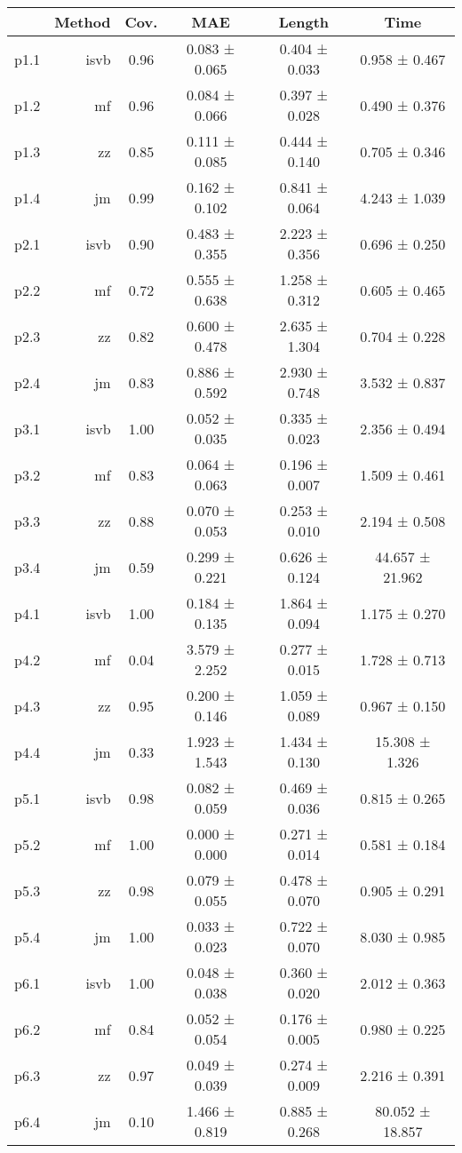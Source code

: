 
\begin{tabular}{lrcccc}
\toprule
  & Method & Cov.  & MAE & Length & Time\\
\midrule
p1.1 & isvb & 0.96 & 0.083 ± 0.065 & 0.404 ± 0.033 & 0.958 ± 0.467\\
p1.2 & mf & 0.96 & 0.084 ± 0.066 & 0.397 ± 0.028 & 0.490 ± 0.376\\
p1.3 & zz & 0.85 & 0.111 ± 0.085 & 0.444 ± 0.140 & 0.705 ± 0.346\\
p1.4 & jm & 0.99 & 0.162 ± 0.102 & 0.841 ± 0.064 & 4.243 ± 1.039\\
\hline
p2.1 & isvb & 0.90 & 0.483 ± 0.355 & 2.223 ± 0.356 & 0.696 ± 0.250\\
p2.2 & mf & 0.72 & 0.555 ± 0.638 & 1.258 ± 0.312 & 0.605 ± 0.465\\
p2.3 & zz & 0.82 & 0.600 ± 0.478 & 2.635 ± 1.304 & 0.704 ± 0.228\\
p2.4 & jm & 0.83 & 0.886 ± 0.592 & 2.930 ± 0.748 & 3.532 ± 0.837\\
\hline
p3.1 & isvb & 1.00 & 0.052 ± 0.035 & 0.335 ± 0.023 & 2.356 ± 0.494\\
p3.2 & mf & 0.83 & 0.064 ± 0.063 & 0.196 ± 0.007 & 1.509 ± 0.461\\
p3.3 & zz & 0.88 & 0.070 ± 0.053 & 0.253 ± 0.010 & 2.194 ± 0.508\\
p3.4 & jm & 0.59 & 0.299 ± 0.221 & 0.626 ± 0.124 & 44.657 ± 21.962\\
\hline
p4.1 & isvb & 1.00 & 0.184 ± 0.135 & 1.864 ± 0.094 & 1.175 ± 0.270\\
p4.2 & mf & 0.04 & 3.579 ± 2.252 & 0.277 ± 0.015 & 1.728 ± 0.713\\
p4.3 & zz & 0.95 & 0.200 ± 0.146 & 1.059 ± 0.089 & 0.967 ± 0.150\\
p4.4 & jm & 0.33 & 1.923 ± 1.543 & 1.434 ± 0.130 & 15.308 ± 1.326\\
\hline
p5.1 & isvb & 0.98 & 0.082 ± 0.059 & 0.469 ± 0.036 & 0.815 ± 0.265\\
p5.2 & mf & 1.00 & 0.000 ± 0.000 & 0.271 ± 0.014 & 0.581 ± 0.184\\
p5.3 & zz & 0.98 & 0.079 ± 0.055 & 0.478 ± 0.070 & 0.905 ± 0.291\\
p5.4 & jm & 1.00 & 0.033 ± 0.023 & 0.722 ± 0.070 & 8.030 ± 0.985\\
\hline
p6.1 & isvb & 1.00 & 0.048 ± 0.038 & 0.360 ± 0.020 & 2.012 ± 0.363\\
p6.2 & mf & 0.84 & 0.052 ± 0.054 & 0.176 ± 0.005 & 0.980 ± 0.225\\
p6.3 & zz & 0.97 & 0.049 ± 0.039 & 0.274 ± 0.009 & 2.216 ± 0.391\\
p6.4 & jm & 0.10 & 1.466 ± 0.819 & 0.885 ± 0.268 & 80.052 ± 18.857\\
\bottomrule
\end{tabular}

